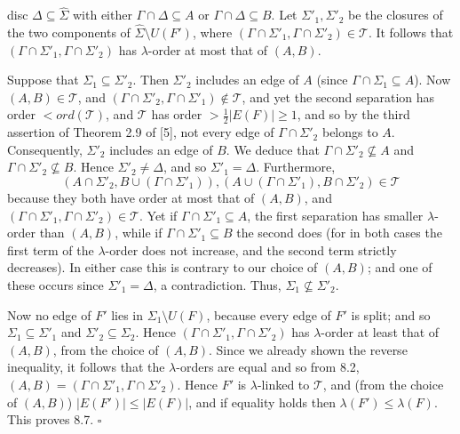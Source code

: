 \noindent disc $\Delta \subseteq \hat{\Sigma}$ with either $\Gamma \cap \Delta \subseteq A$ or $\Gamma \cap \Delta \subseteq B$. Let $\Sigma'_1, \Sigma'_2$ be the closures of the two components of $\hat{\Sigma} \setminus U(F')$, where $(\Gamma \cap \Sigma'_1, \Gamma \cap \Sigma'_2) \in \mathscr{T}$. It follows that $(\Gamma \cap \Sigma'_1, \Gamma \cap \Sigma'_2)$ has $\lambda$-order at most that of $(A, B)$.

Suppose that $\Sigma_1 \subseteq \Sigma'_2$. Then $\Sigma'_2$ includes an edge of $A$ (since $\Gamma \cap \Sigma_1 \subseteq A$). Now $(A, B) \in \mathscr{T}$, and $(\Gamma \cap \Sigma'_2, \Gamma \cap \Sigma'_1) \notin \mathscr{T}$, and yet the second separation has order $< ord(\mathscr{T})$, and $\mathscr{T}$ has order $> \frac{1}{2} |E(F)| \ge 1$, and so by the third assertion of Theorem 2.9 of [5], not every edge of $\Gamma \cap \Sigma'_2$ belongs to $A$. Consequently, $\Sigma'_2$ includes an edge of $B$. We deduce that $\Gamma \cap \Sigma'_2 \nsubseteq A$ and $\Gamma \cap \Sigma'_2 \nsubseteq B$. Hence $\Sigma'_2 \ne \Delta$, and so $\Sigma'_1 = \Delta$. Furthermore,
\begin{equation*}
(A \cap \Sigma'_2, B \cup (\Gamma \cap \Sigma'_1)), (A \cup (\Gamma \cap \Sigma'_1), B \cap \Sigma'_2) \in \mathscr{T}
\end{equation*}
because they both have order at most that of $(A, B)$, and $(\Gamma \cap \Sigma'_1, \Gamma \cap \Sigma'_2) \in \mathscr{T}$. Yet if $\Gamma \cap \Sigma'_1 \subseteq A$, the first separation has smaller $\lambda$-order than $(A, B)$, while if $\Gamma \cap \Sigma'_1 \subseteq B$ the second does (for in both cases the first term of the $\lambda$-order does not increase, and the second term strictly decreases). In either case this is contrary to our choice of $(A, B)$; and one of these occurs since $\Sigma'_1 = \Delta$, a contradiction. Thus, $\Sigma_1 \nsubseteq \Sigma'_2$.

Now no edge of $F'$ lies in $\Sigma_1 \setminus U(F)$, because every edge of $F'$ is split; and so $\Sigma_1 \subseteq \Sigma'_1$ and $\Sigma'_2 \subseteq \Sigma_2$. Hence $(\Gamma \cap \Sigma'_1, \Gamma \cap \Sigma'_2)$ has $\lambda$-order at least that of $(A, B)$, from the choice of $(A, B)$. Since we already shown the reverse inequality, it follows that the $\lambda$-orders are equal and so from 8.2, $(A, B) = (\Gamma \cap \Sigma'_1, \Gamma \cap \Sigma'_2)$. Hence $F'$ is $\lambda$-linked to $\mathscr{T}$, and (from the choice of $(A, B)$) $|E(F')| \le |E(F)|$, and if equality holds then $\lambda(F') \le \lambda(F)$. This proves 8.7. $\square$

